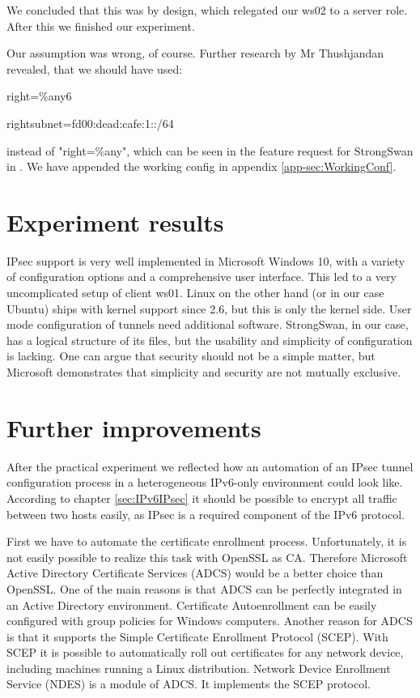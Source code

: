 \documentclass[a4paper]{report}
\begin{document}
We concluded that this was by design, which relegated our ws02 to a server role. After this we finished our experiment.

Our assumption was wrong, of course. Further research by Mr Thushjandan revealed, that we should have used:

\begin{codebox}
	right=\%any6
	
	\noindent rightsubnet=fd00:dead:cafe:1::/64
\end{codebox}

instead of "right=\%any", which can be seen in the feature request for StrongSwan in \cite{Brunner2012}. We have appended the working config in appendix \ref{app-sec:WorkingConf}.

\section{Experiment results}
\label{sec:ExpRes}
IPsec support is very well implemented in Microsoft Windows 10, with a variety of configuration options and a comprehensive user interface. This led to a very uncomplicated setup of client ws01. Linux on the other hand (or in our case Ubuntu) ships with kernel support since 2.6, but this is only the kernel side. User mode configuration of tunnels need additional software. StrongSwan, in our case, has a logical structure of its files, but the usability and simplicity of configuration is lacking. One can argue that security should not be a simple matter, but Microsoft demonstrates that simplicity and security are not mutually exclusive. 

\section{Further improvements}
After the practical experiment we reflected how an automation of an IPsec tunnel configuration process in a heterogeneous IPv6-only environment could look like. 
According to chapter \ref{sec:IPv6IPsec} it should be possible to encrypt all traffic between two hosts easily, as IPsec is a required component of the IPv6 protocol.

First we have to automate the certificate enrollment process. Unfortunately, it is not easily possible to realize this task with OpenSSL as CA. 
Therefore Microsoft Active Directory Certificate Services (ADCS) would be a better choice than OpenSSL. 
One of the main reasons is that ADCS can be perfectly integrated in an Active Directory environment. Certificate Autoenrollment can be easily configured with group policies for Windows computers. 
Another reason for ADCS is that it supports the Simple Certificate Enrollment Protocol (SCEP).
With SCEP it is possible to automatically roll out certificates for any network device, including machines running a Linux distribution. 
Network Device Enrollment Service (NDES) is a module of ADCS. It implements the SCEP protocol. 
\end{document}
